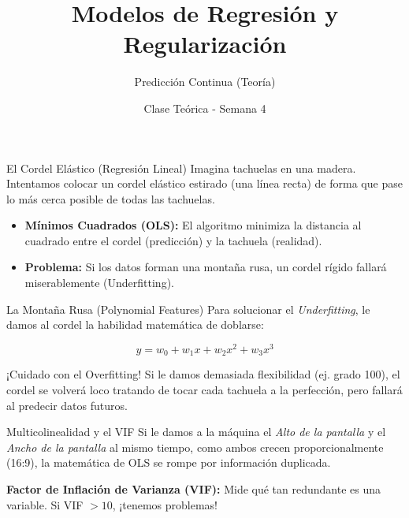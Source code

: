 \documentclass[aspectratio=169]{beamer}
\title{Modelos de Regresión y Regularización}
\subtitle{Predicción Continua (Teoría)}
\author{Clase Teórica - Semana 4}
\date{}
\begin{document}
\begin{frame}
    \titlepage
\end{frame}

\begin{frame}{El Cordel Elástico (Regresión Lineal)}
    Imagina tachuelas en una madera. Intentamos colocar un cordel elástico estirado (una línea recta) de forma que pase lo más cerca posible de todas las tachuelas.
    
    \begin{itemize}
        \item \textbf{Mínimos Cuadrados (OLS):} El algoritmo minimiza la distancia al cuadrado entre el cordel (predicción) y la tachuela (realidad).
        \item \textbf{\textcolor{AzulMarino}{Problema:}} Si los datos forman una montaña rusa, un cordel rígido fallará miserablemente (Underfitting).
    \end{itemize}
\end{frame}

\begin{frame}{La Montaña Rusa (Polynomial Features)}
    Para solucionar el \textit{Underfitting}, le damos al cordel la habilidad matemática de doblarse:
    
    $$y = w_0 + w_1 x + w_2 x^2 + w_3 x^3$$
    
    \begin{alertblock}{¡Cuidado con el Overfitting!}
    Si le damos demasiada flexibilidad (ej. grado 100), el cordel se volverá loco tratando de tocar cada tachuela a la perfección, pero fallará al predecir datos futuros.
    \end{alertblock}
\end{frame}

\begin{frame}{Multicolinealidad y el VIF}
    Si le damos a la máquina el \textit{Alto de la pantalla} y el \textit{Ancho de la pantalla} al mismo tiempo, como ambos crecen proporcionalmente (16:9), la matemática de OLS se rompe por información duplicada.
    \vspace{0.3cm}
    
    \textbf{Factor de Inflación de Varianza (VIF):} Mide qué tan redundante es una variable. Si VIF $> 10$, ¡tenemos problemas!
\end{frame}
\end{document}
